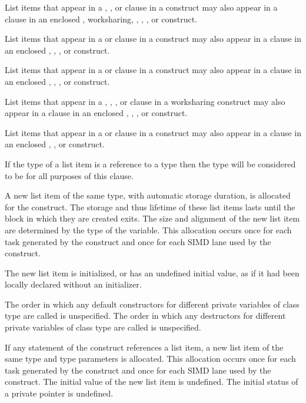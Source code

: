 List items that appear in a , , or
 clause in a  construct may also appear
in a  clause in an enclosed ,
worksharing, , , , or
 construct.

List items that appear in a  or 
clause in a  construct may also appear in a 
clause in an enclosed , , , or
construct.

List items that appear in a  or 
clause in a  construct may also appear in a 
clause in an enclosed , , , or
construct.

List items that appear in a , ,
, or  clause in a worksharing
construct may also appear in a  clause in an enclosed
, , , or  construct.

List items that appear in a  or 
clause in a  construct may also appear in a 
clause in an enclosed , , or 
construct.

\ccppspecificstart
If the type of a list item is a reference to a type  then the type will be considered to be 
 for all purposes of this clause.

A new list item of the same type, with automatic storage duration, is allocated for the 
construct. The storage and thus lifetime of these list items lasts until the block in which 
they are created exits. The size and alignment of the new list item are determined by the 
type of the variable. This allocation occurs once for each task generated by the construct 
and once for each SIMD lane used by the construct.

The new list item is initialized, or has an undefined initial value, as if it had been locally 
declared without an initializer. 
\ccppspecificend

\cppspecificstart
The order in which any default constructors for different private variables of class type 
are called is unspecified. The order in which any destructors for different private 
variables of class type are called is unspecified.
\cppspecificend

\fortranspecificstart 
If any statement of the construct references a list item, a new list
item of the same type and type parameters is allocated. This
allocation occurs once for each task generated by the construct and
once for each SIMD lane used by the construct. The initial value of
the new list item is undefined. The initial status of a private
pointer is undefined.


